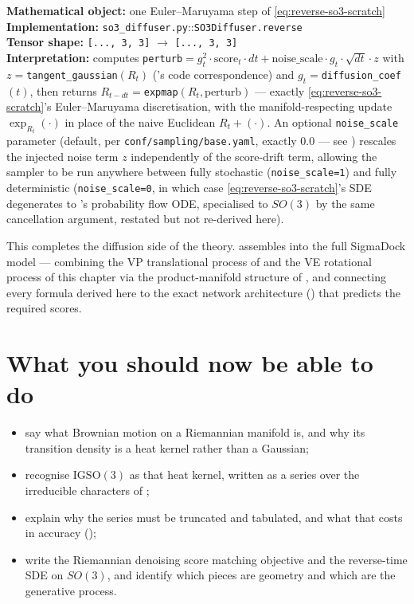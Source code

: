 \documentclass[11pt,a4paper]{report}
\theoremstyle{definition}
\theoremstyle{remark}
\newcommand{\file}[1]{\texttt{#1}}
\newcommand{\pyfunc}[1]{\texttt{#1}}
\newcommand{\shape}[1]{\texttt{[#1]}}
\begin{document}
\begin{codebox}
\textbf{Mathematical object:} one Euler--Maruyama step of
\eqref{eq:reverse-so3-scratch} \\
\textbf{Implementation:} \file{so3\_diffuser.py}::\pyfunc{SO3Diffuser.reverse} \\
\textbf{Tensor shape:} \shape{..., 3, 3} $\to$ \shape{..., 3, 3} \\
\textbf{Interpretation:} computes
\texttt{perturb}$= g_t^2\cdot\text{score}_t\cdot dt + \text{noise\_scale}\cdot g_t\cdot\sqrt{dt}\cdot z$
with $z=$\pyfunc{tangent\_gaussian}$(R_t)$ ('s
code correspondence) and $g_t=$\pyfunc{diffusion\_coef}$(t)$, then returns
$R_{t-dt}=$\pyfunc{expmap}$(R_t,\text{perturb})$ --- exactly
\eqref{eq:reverse-so3-scratch}'s Euler--Maruyama discretisation, with the
manifold-respecting update $\exp_{R_t}(\cdot)$ in place of the naive
Euclidean $R_t+(\cdot)$. An optional \texttt{noise\_scale} parameter
(default, per \file{conf/sampling/base.yaml}, exactly $0.0$ --- see
) rescales the injected noise term $z$ independently
of the score-drift term, allowing the sampler to be run anywhere between
fully stochastic (\texttt{noise\_scale=1}) and fully deterministic
(\texttt{noise\_scale=0}, in which case \eqref{eq:reverse-so3-scratch}'s
SDE degenerates to 's probability flow ODE,
specialised to $SO(3)$ by the same cancellation argument, restated but not
re-derived here).
\end{codebox}

This completes the diffusion side of the theory. 
assembles  into the full SigmaDock
model --- combining the VP translational process of  and
the VE rotational process of this chapter via the product-manifold
structure of , and connecting every formula derived
here to the exact network architecture () that
predicts the required scores.


\section{What you should now be able to do}

\begin{itemize}[nosep]
\item say what Brownian motion on a Riemannian manifold is, and why its transition density is a heat kernel rather than a Gaussian;
\item recognise $\mathrm{IGSO}(3)$ as that heat kernel, written as a series over the irreducible characters of ;
\item explain why the series must be truncated and tabulated, and what that costs in accuracy ();
\item write the Riemannian denoising score matching objective and the reverse-time SDE on $SO(3)$, and identify which pieces are geometry and which are the generative process.
\end{itemize}
\end{document}
